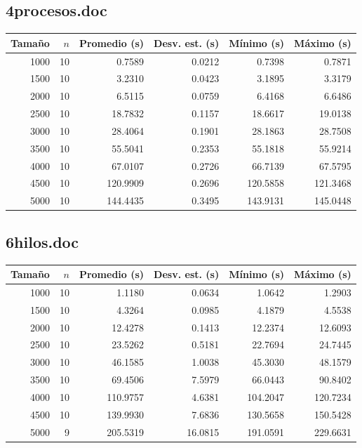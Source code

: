 \documentclass[conference]{IEEEtran}
\begin{document}
\subsection{4procesos.doc}
\begin{center}
\begin{tabular}{rrrrrr}
\toprule
Tamaño & $n$ & Promedio (s) & Desv. est. (s) & Mínimo (s) & Máximo (s) \\
\midrule
1000 & 10 & 0.7589 & 0.0212 & 0.7398 & 0.7871 \\
1500 & 10 & 3.2310 & 0.0423 & 3.1895 & 3.3179 \\
2000 & 10 & 6.5115 & 0.0759 & 6.4168 & 6.6486 \\
2500 & 10 & 18.7832 & 0.1157 & 18.6617 & 19.0138 \\
3000 & 10 & 28.4064 & 0.1901 & 28.1863 & 28.7508 \\
3500 & 10 & 55.5041 & 0.2353 & 55.1818 & 55.9214 \\
4000 & 10 & 67.0107 & 0.2726 & 66.7139 & 67.5795 \\
4500 & 10 & 120.9909 & 0.2696 & 120.5858 & 121.3468 \\
5000 & 10 & 144.4435 & 0.3495 & 143.9131 & 145.0448 \\
\bottomrule
\end{tabular}
\end{center}
\subsection{6hilos.doc}
\begin{center}
\begin{tabular}{rrrrrr}
\toprule
Tamaño & $n$ & Promedio (s) & Desv. est. (s) & Mínimo (s) & Máximo (s) \\
\midrule
1000 & 10 & 1.1180 & 0.0634 & 1.0642 & 1.2903 \\
1500 & 10 & 4.3264 & 0.0985 & 4.1879 & 4.5538 \\
2000 & 10 & 12.4278 & 0.1413 & 12.2374 & 12.6093 \\
2500 & 10 & 23.5262 & 0.5181 & 22.7694 & 24.7445 \\
3000 & 10 & 46.1585 & 1.0038 & 45.3030 & 48.1579 \\
3500 & 10 & 69.4506 & 7.5979 & 66.0443 & 90.8402 \\
4000 & 10 & 110.9757 & 4.6381 & 104.2047 & 120.7234 \\
4500 & 10 & 139.9930 & 7.6836 & 130.5658 & 150.5428 \\
5000 & 9 & 205.5319 & 16.0815 & 191.0591 & 229.6631 \\
\bottomrule
\end{tabular}
\end{center}
\end{document}
